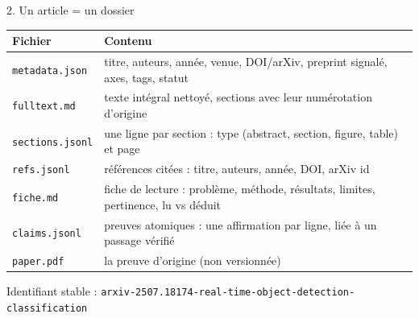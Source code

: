 \documentclass[aspectratio=169,11pt]{beamer}
\begin{document}
\begin{frame}{2. Un article = un dossier}
  \small
  \renewcommand{\arraystretch}{1.25}
  \begin{tabularx}{\textwidth}{@{}lL@{}}
    \toprule
    \textbf{Fichier} & \textbf{Contenu} \\
    \midrule
    \texttt{metadata.json}  & titre, auteurs, année, venue, DOI/arXiv, preprint signalé, axes, tags, statut \\
    \texttt{fulltext.md}    & texte intégral nettoyé, sections avec leur numérotation d'origine \\
    \texttt{sections.jsonl} & une ligne par section : type (abstract, section, figure, table) et \alert{page} \\
    \texttt{refs.jsonl}     & références citées : titre, auteurs, année, DOI, arXiv id \\
    \texttt{fiche.md}       & \textcolor{acc}{fiche de lecture} : problème, méthode, résultats, limites, pertinence, lu vs déduit \\
    \texttt{claims.jsonl}   & \textcolor{acc}{preuves atomiques} : une affirmation par ligne, liée à un passage vérifié \\
    \texttt{paper.pdf}      & la preuve d'origine (non versionnée) \\
    \bottomrule
  \end{tabularx}

  \medskip
  Identifiant stable : \texttt{arxiv-2507.18174-real-time-object-detection-classification}
\end{frame}
\end{document}
